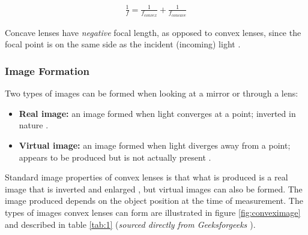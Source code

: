\documentclass[12pt]{article}
\begin{document}
\begin{gather} \label{eq:2}
    \frac{1}{f} = \frac{1}{f_{convex}} + \frac{1}{f_{concave}}
\end{gather}

Concave lenses have \textit{negative} focal length, as opposed to convex lenses, since the focal point is on the same side as the incident (incoming) light \cite{geekconcave}.

\subsubsection{Image Formation} \label{sec:1.1.2}

Two types of images can be formed when looking at a mirror or through a lens:
\begin{itemize}
    \item \textbf{Real image:} an image formed when light converges at a point; inverted in nature \cite{geekrelvir}.
    \item \textbf{Virtual image:} an image formed when light diverges away from a point; appears to be produced but is not actually present \cite{geekrelvir}.
\end{itemize}

Standard image properties of convex lenses is that what is produced is a real image that is inverted and enlarged
\cite{geekconvex}, but virtual images can also be formed.
The image produced depends on the object position at the time of measurement.
The types of images convex lenses can form are illustrated in figure \ref{fig:conveximage} and described in table \ref{tab:1} (\textit{sourced directly from Geeksforgeeks \cite{geekconvex}}).
\end{document}
